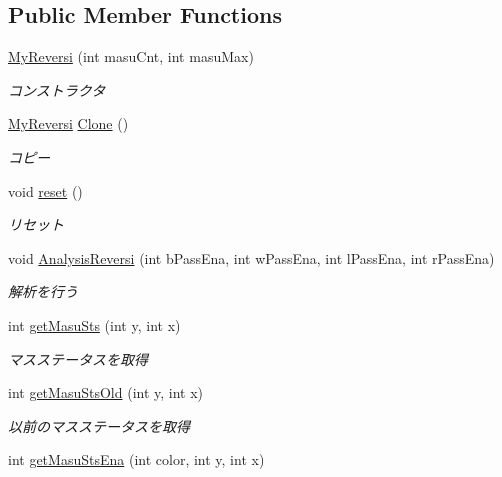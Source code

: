 \subsection*{Public Member Functions}
\begin{DoxyCompactItemize}
\item 
\hyperlink{class_reversi4color_form_1_1_my_reversi_af58387f6a43abefc531e9098cdb5e08d}{My\+Reversi} (int masu\+Cnt, int masu\+Max)
\begin{DoxyCompactList}\small\item\em コンストラクタ \end{DoxyCompactList}\item 
\hyperlink{class_reversi4color_form_1_1_my_reversi}{My\+Reversi} \hyperlink{class_reversi4color_form_1_1_my_reversi_a45ce9de1a7d3209c2ad6c256ad1c4fe8}{Clone} ()
\begin{DoxyCompactList}\small\item\em コピー \end{DoxyCompactList}\item 
void \hyperlink{class_reversi4color_form_1_1_my_reversi_aeb24b855c540f99c901de08b11af1dd6}{reset} ()
\begin{DoxyCompactList}\small\item\em リセット \end{DoxyCompactList}\item 
void \hyperlink{class_reversi4color_form_1_1_my_reversi_ade9840e10e80b3e908a406efe9ee1372}{Analysis\+Reversi} (int b\+Pass\+Ena, int w\+Pass\+Ena, int l\+Pass\+Ena, int r\+Pass\+Ena)
\begin{DoxyCompactList}\small\item\em 解析を行う \end{DoxyCompactList}\item 
int \hyperlink{class_reversi4color_form_1_1_my_reversi_adc564d9d8aa75a871d33e09373485530}{get\+Masu\+Sts} (int y, int x)
\begin{DoxyCompactList}\small\item\em マスステータスを取得 \end{DoxyCompactList}\item 
int \hyperlink{class_reversi4color_form_1_1_my_reversi_aa56088eff96a48e68d4c7f688fe06b8d}{get\+Masu\+Sts\+Old} (int y, int x)
\begin{DoxyCompactList}\small\item\em 以前のマスステータスを取得 \end{DoxyCompactList}\item 
int \hyperlink{class_reversi4color_form_1_1_my_reversi_ac17f7f56dd24fa06ac8d394290feafef}{get\+Masu\+Sts\+Ena} (int color, int y, int x)

\end{DoxyCompactItemize}
